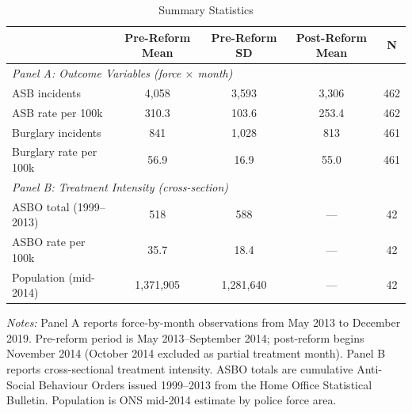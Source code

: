\begin{table}[htbp]
\centering
\caption{Summary Statistics}
\label{tab:summary}
\begin{threeparttable}
\begin{tabular}{lcccc}
\hline\hline
 & Pre-Reform Mean & Pre-Reform SD & Post-Reform Mean & N \\
\hline
\multicolumn{5}{l}{\textit{Panel A: Outcome Variables (force $\times$ month)}} \\
ASB incidents & 4,058 & 3,593 & 3,306 & 462 \\
ASB rate per 100k & 310.3 & 103.6 & 253.4 & 462 \\
Burglary incidents & 841 & 1,028 & 813 & 461 \\
Burglary rate per 100k & 56.9 & 16.9 & 55.0 & 461 \\
\hline
\multicolumn{5}{l}{\textit{Panel B: Treatment Intensity (cross-section)}} \\
ASBO total (1999--2013) & 518 & 588 & --- & 42 \\
ASBO rate per 100k & 35.7 & 18.4 & --- & 42 \\
Population (mid-2014) & 1,371,905 & 1,281,640 & --- & 42 \\
\hline\hline
\end{tabular}
\begin{tablenotes}[flushleft]\small
\item \textit{Notes:} Panel A reports force-by-month observations from May 2013 to December 2019. Pre-reform period is May 2013--September 2014; post-reform begins November 2014 (October 2014 excluded as partial treatment month). Panel B reports cross-sectional treatment intensity. ASBO totals are cumulative Anti-Social Behaviour Orders issued 1999--2013 from the Home Office Statistical Bulletin. Population is ONS mid-2014 estimate by police force area.
\end{tablenotes}
\end{threeparttable}
\end{table}

